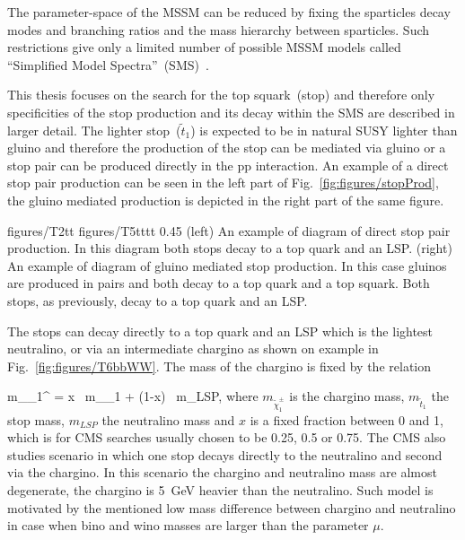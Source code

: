 The parameter-space of the MSSM can be reduced by fixing the sparticles decay modes and branching ratios and the mass hierarchy between sparticles. Such restrictions give only a limited number of possible MSSM models called ``Simplified Model Spectra''~(SMS)~\cite{Alves:2011wf, Alwall:2008ag, Chatrchyan:2013sza}.

This thesis focuses on the search for the top squark~(stop) and therefore only specificities of the stop production and its decay within the SMS are described in larger detail. The lighter stop~($\tilde{t}_{1}$) is expected to be in natural SUSY lighter than gluino and therefore the production of the stop can be mediated via gluino or a stop pair can be produced directly in the pp interaction. An example of a direct stop pair production can be seen in the left part of Fig.~\ref{fig:figures/stopProd}, the gluino mediated production is depicted in the right part of the same figure.


                 {figures/T2tt}
                 {figures/T5tttt} %
                 {0.45}       %
                 {(left) An example of diagram of direct stop pair production. In this diagram both stops decay to a top quark and an LSP. (right)  An example of diagram of gluino mediated stop production. In this case gluinos are produced in pairs and both decay to a top quark and a top squark. Both stops, as previously, decay to a top quark and an LSP. } %

The stops can decay directly to a top quark and an LSP which is the lightest neutralino, or via an intermediate chargino as shown on example in Fig.~\ref{fig:figures/T6bbWW}. The mass of the chargino is fixed by the relation

{
m_{\tilde{\chi}_{1}^{\pm}} = x ~m_{_{1}} + (1-x) ~m_{LSP},
}
where $m_{\tilde{\chi}_{1}^{\pm}}$ is the chargino mass, $m_{\tilde{t}_{1}}$ the stop mass, $m_{LSP}$ the neutralino mass and $x$ is a fixed fraction between 0 and 1, which is for CMS searches usually chosen to be 0.25, 0.5 or 0.75. The CMS also studies scenario in which one stop decays directly to the neutralino and second via the chargino. In this scenario the chargino and neutralino mass are almost degenerate, the chargino is 5~GeV heavier than the neutralino. Such model is motivated by the mentioned low mass difference between chargino and neutralino in case when bino and wino masses are larger than the parameter $\mu$.

